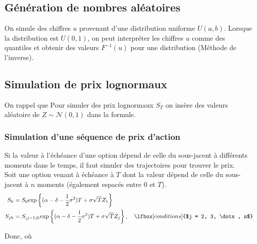 \documentclass[10pt, french]{article}
\begin{document}
\begin{multicols*}{2}
\columnbreak
\subsection{Génération de nombres aléatoires}
On simule des chiffres $u$ provenant d'une distribution uniforme $U(a, b)$. Lorsque la distribution est $U(0, 1)$, on peut interpréter les chiffres $u$ comme des quantiles et obtenir des valeurs $F^{-1}(u)$ pour une distribution (Méthode de l'inverse).

\subsection{Simulation de prix lognormaux}
On rappel que 
Pour simuler des prix lognormaux $S_{T}$ on insère des valeurs aléatoire de $Z \sim \mathcal{N}(0, 1)$ dans la formule.

\subsubsection*{Simulation d'une séquence de prix d'action}
Si la valeur à l'échéance d'une option dépend de celle du sous-jacent à différents moments dans le temps, il faut simuler des trajectoires pour trouver le prix.\\

Soit une option venant à échéance à $T$ dont la valeur dépend de celle du sous-jacent à $n$ moments (également espacés entre $0$ et $T$). 
\begin{align*}
	S_{h}	
	&=	S_{0}\textrm{exp}\left\{ (\alpha - \delta - \frac{1}{2}\sigma^{2})T + \sigma\sqrt{T} Z_{1} \right\}	\\
	S_{jh}	
	&=	S_{(j - 1)h}\textrm{exp}\left\{ (\alpha - \delta - \frac{1}{2}\sigma^{2})T + \sigma\sqrt{T} Z_{j} \right\},	\quad	\lfbox[conditions]{$j	=	2, 3, \dots, n$}
\end{align*}

Donc,  où 


\columnbreak

\end{multicols*}
\end{document}
